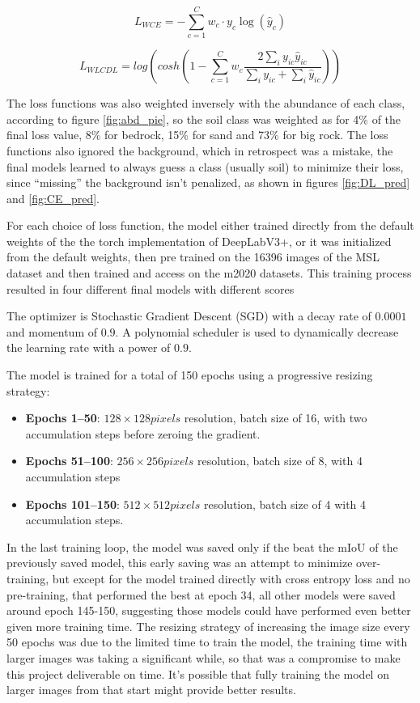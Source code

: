 \documentclass[10pt, conference]{IEEEtran}
\begin{document}
\begin{equation}
  L_{WCE} = - \sum_{c=1}^{C} w_c \cdot y_c \log(\hat{y}_c)
  \label{eq:WCE}
\end{equation}

\begin{equation}
  L_{WLCDL} = log(cosh(1 - \sum_{c=1}^{C} w_c \frac{2 \sum_{i} y_{ic} \hat{y}_{ic}}{\sum_{i} y_{ic} + \sum_{i} \hat{y}_{ic}}))
  \label{eq:LCDL}
\end{equation}

The loss functions was also weighted inversely with the abundance of each class, according
to figure \ref{fig:abd_pie}, so the soil class was weighted as for 4\% of the final loss value,
8\% for bedrock, 15\% for sand and 73\% for big rock. The loss functions also
ignored the background, which in retrospect was a mistake, the final models learned to always guess
a class (usually soil) to minimize their loss, since ``missing'' the background isn't penalized,
as shown in figures \ref{fig:DL_pred} and \ref{fig:CE_pred}.

For each choice of loss function, the model either trained directly from the default weights of the
the torch implementation of DeepLabV3+, or it was initialized from the default weights, then pre trained on the 16396 images of the MSL dataset and then trained and access on the m2020 datasets. This training process
resulted in four different final models with different scores

The optimizer is Stochastic Gradient Descent (SGD) with a decay 
rate of $0.0001$ and momentum of $0.9$. A polynomial scheduler 
is used to dynamically decrease the learning rate with a power of $0.9$.

The model is trained for a total of 150 epochs using a progressive 
resizing strategy:
\begin{itemize}
\item \textbf{Epochs 1--50}: $128 \times 128 pixels$ resolution, batch size of 16,
  with two accumulation steps before zeroing the gradient.
\item \textbf{Epochs 51--100}: $256 \times 256 pixels$ resolution, batch size of 8, with 4
  accumulation steps
\item \textbf{Epochs 101--150}: $512 \times 512 pixels$ resolution, batch size of 4 with 4
  accumulation steps.
\end{itemize}
In the last training loop, the model was saved only if the beat the mIoU of the previously saved model,
this early saving was an attempt to minimize over-training, but except for the model trained directly
with cross entropy loss and no pre-training, that performed the best at epoch 34, all other models
were saved around epoch 145-150, suggesting those models could have performed even better given more
training time. The resizing strategy of increasing the image size every 50 epochs
was due to the limited time to train the model, the training time with larger images was
taking a significant while, so that was a compromise to make this project deliverable on time.
It's possible that fully training the model on larger images from that start might provide better
results.
\end{document}
